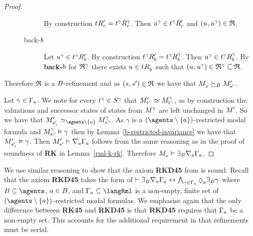 \begin{proof}
\begin{description}
\begin{description}
                By construction $\kSuccessorsPC{\kStateT} = \kSuccessorsC[\gamma]{\kStateT[\gamma]}$.
                Then $\kStateU[\gamma] \in \kSuccessorsPC{\kStateT[\gamma]}$ and $(\kStateU, \kStateU[\gamma]) \in \refinement$.
            \item[back-$\agentB$]
                Let $\kStateU[\gamma] \in \kSuccessorsPB{\kStateT[\gamma]}$.
                By construction $\kSuccessorsPB{\kStateT[\gamma]} = \kSuccessorsB[\gamma]{\kStateT[\gamma]}$.
                Then $\kStateU[\gamma] \in \kSuccessorsB[\gamma]{\kStateT[\gamma]}$.
                By {\bf back-$\agentB$} for $\refinement^\gamma$ there exists $\kStateU \in \kSuccessorsB{\kStateT}$ such that $(\kStateU, \kStateU[\gamma]) \in \refinement^\gamma \subseteq \refinement$.
        \end{description}
\end{description}

Therefore $\refinement$ is a $\agentsB$-refinement and as $(\kStateS, \kStateSP) \in \refinement$ we have that $\kPModel{\kStateS} \simulatesBs \kPModelP{\kStateSP}$.

Let $\gamma \in \Gamma_\agentA$.
We note for every $\kStateT[\gamma] \in \kStates[\gamma]$ that $\kPModelP{\kStateT[\gamma]} \bisimilar \kPModel[\gamma]{\kStateT[\gamma]}$, as by construction the valuations and successor states of states from $\kModel[\gamma]$ are left unchanged in $\kModelP$.
So we have that $\kPModelP{\kStateSP_\gamma} \bisimilar[\agents \setminus \{\agentA\}] \kPModel[\gamma]{\kStateS[\gamma]}$.
As $\gamma$ is a $(\agents \setminus \{\agentA\})$-restricted modal formula and $\kPModel[\gamma]{\kStateS[\gamma]} \entails \gamma$ then by Lemma~\ref{b-restricted-invariance} we have that $\kPModelP{\kStateSP_\gamma} \entails \gamma$.
Then $\kPModelP{\kStateSP} \entails \coversA \Gamma_\agentA$ follows from the same reasoning as in the proof of soundness of {\bf RK} in Lemma~\ref{rml-k-rk}.
Therefore $\kPModel{\kStateS} \entails \somerefsBs \coversA \Gamma_\agentA$.
\end{proof}

We use similar reasoning to show that the axiom {\bf RKD45} from \axiomRmlKD{} is sound.
Recall that the axiom {\bf RKD45} takes the form of $\proves \somerefsBs \coversA \Gamma_\agentA \iff \bigwedge_{\gamma \in \Gamma_\agentA} \possibleA \somerefsBs \gamma$ where $\agentsB \subseteq \agents$, $\agentA \in \agentsB$, and $\Gamma_\agentA \subseteq \langRml$ is a non-empty, finite set of $(\agents \setminus \{\agentA\})$-restricted modal formulas.
We emphasise again that the only difference between {\bf RK45} and {\bf RKD45} is that {\bf RKD45} requires that $\Gamma_\agentA$ be a non-empty set.
This accounts for the additional requirement in \logicRmlKD{} that refinements must be serial.

